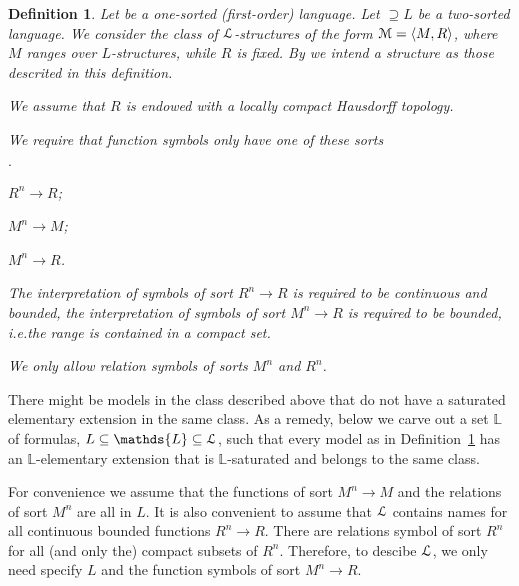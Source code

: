 \documentclass[11pt,oneside]{amsart}
\newcommand{\mylabel}[1]{{#1}\hfill}
\renewenvironment{itemize}
  {\begin{list}{$\cdot$}{%
   \setlength{\parskip}{0mm}
   \setlength{\topsep}{.2\baselineskip}
   \setlength{\rightmargin}{0mm}
   \setlength{\listparindent}{0mm}
   \setlength{\itemindent}{0mm}
   \setlength{\labelwidth}{3ex}
   \setlength{\itemsep}{.2\baselineskip}
   \setlength{\parsep}{.2\baselineskip}
   \setlength{\partopsep}{0mm}
   \setlength{\labelsep}{1ex}
   \setlength{\leftmargin}{\labelwidth+\labelsep}
   \let\makelabel\mylabel}}{%
   \end{list}}
\theoremstyle{plain}
\newtheorem{definition}[theorem]{Definition}
\theoremstyle{remark}
\renewcommand*{\emph}[1]{%
   \smash{\tikz[baseline]\node[rectangle, fill=olive!25, rounded corners, inner xsep=0.5ex, inner ysep=0.2ex, anchor=base, minimum height = 2.7ex]{#1};}}
\begin{document}
\begin{definition}\label{def_0}
  Let \emph{$L$\/} be a one-sorted (first-order) language.
  Let \emph{${\EuScript L}$\/}$\supseteq L$ be a two-sorted language.
  We consider the class of ${\EuScript L}$-structures of the form ${\EuScript M}=\langle  M,R\rangle$, where $M$ ranges over $L$-structures, while $R$ is fixed.
  By \emph{model\/} we intend a structure as those descrited in this definition.

  We assume that $R$ is endowed with a locally compact Hausdorff topology.

  We require that function symbols only have one of these sorts
  \begin{itemize}
    \item[i.] $R^n\to R$;
    \item[ii.] $M^n\to M$;
    \item[iii.] $M^n\to R$.
  \end{itemize}
  The interpretation of symbols of sort $R^n\to R$ is required to be continuous and bounded, the interpretation of symbols of sort $M^n\to R$ is required to be bounded, i.e.\@ the range is contained in a compact set.

  We only allow relation symbols of sorts $M^n$ and $R^n$.
\end{definition}

There might be models in the class described above that do not have a saturated elementary extension in the same class.
As a remedy, below we carve out a set $\mathds{L}$ of formulas, $L\subseteq\mathds{L}\subseteq {\EuScript L}$, such that every model as in Definition~\ref{def_0} has an $\mathds{L}$-elementary extension that is $\mathds{L}$-saturated and belongs to the same class.

For convenience we assume that the functions of sort $M^n\to M$ and the relations of sort $M^n$ are all in $L$.
It is also convenient to assume that ${\EuScript L}$ contains names for all continuous bounded functions $R^n\to R$.
There are relations symbol of sort $R^n$ for all (and only the) compact subsets of $R^n$.
Therefore, to descibe ${\EuScript L}$, we only need specify $L$ and the function symbols of sort $M^n\to R$.
\end{document}
